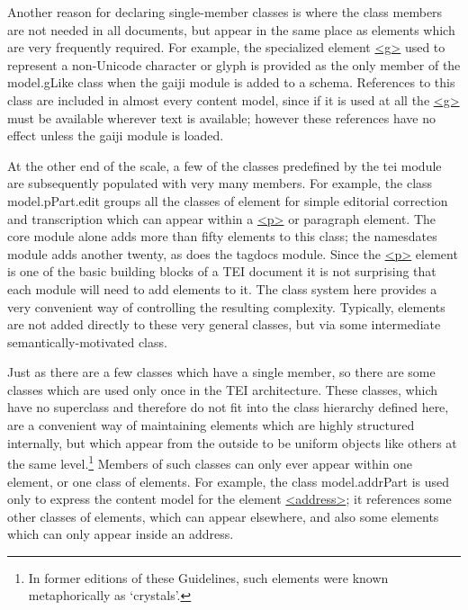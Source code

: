 Another reason for declaring single-member classes is where the class members are not needed in all documents, but appear in the same place as elements which are very frequently required. For example, the specialized element \hyperref[TEI.g]{<g>} used to represent a non-Unicode character or glyph is provided as the only member of the \textsf{model.gLike} class when the \textsf{gaiji} module is added to a schema. References to this class are included in almost every content model, since if it is used at all the \hyperref[TEI.g]{<g>} must be available wherever text is available; however these references have no effect unless the gaiji module is loaded.\par
At the other end of the scale, a few of the classes predefined by the tei module are subsequently populated with very many members. For example, the class \textsf{model.pPart.edit} groups all the classes of element for simple editorial correction and transcription which can appear within a \hyperref[TEI.p]{<p>} or paragraph element. The \textsf{core} module alone adds more than fifty elements to this class; the \textsf{namesdates} module adds another twenty, as does the \textsf{tagdocs} module. Since the \hyperref[TEI.p]{<p>} element is one of the basic building blocks of a TEI document it is not surprising that each module will need to add elements to it. The class system here provides a very convenient way of controlling the resulting complexity. Typically, elements are not added directly to these very general classes, but via some intermediate semantically-motivated class.\par
Just as there are a few classes which have a single member, so there are some classes which are used only once in the TEI architecture. These classes, which have no superclass and therefore do not fit into the class hierarchy defined here, are a convenient way of maintaining elements which are highly structured internally, but which appear from the outside to be uniform objects like others at the same level.\footnote{In former editions of these Guidelines, such elements were known metaphorically as ‘crystals’.} Members of such classes can only ever appear within one element, or one class of elements. For example, the class \textsf{model.addrPart} is used only to express the content model for the element \hyperref[TEI.address]{<address>}; it references some other classes of elements, which can appear elsewhere, and also some elements which can only appear inside an address.
